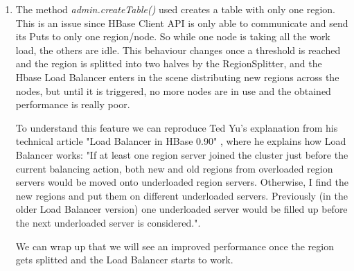 \begin{enumerate}
\item The method \textit{admin.createTable()} used creates a table with only one region. This is an issue since HBase Client API is only able to communicate and send its Puts to only one region/node. So while one node is taking all the work load, the others are idle. This behaviour changes once a threshold is reached and the region is splitted into two halves by the RegionSplitter, and the Hbase Load Balancer enters in the scene distributing new regions across the nodes, but until it is triggered, no more nodes are in use and the obtained performance is really poor.
\par

To understand this feature we can reproduce Ted Yu's explanation from his technical article "Load Balancer in HBase 0.90" \cite{LoadBalancer}, where he explains how Load Balancer works: "If at least one region server joined the cluster just before the current balancing action, both new and old regions from overloaded region servers would be moved onto underloaded region servers. Otherwise, I find the new regions and put them on different underloaded servers. Previously (in the older Load Balancer version) one underloaded server would be filled up before the next underloaded server is considered.".
\par
We can wrap up that we will see an improved performance once the region gets splitted and the Load Balancer starts to work.

\bigskip
{}
\bigskip


\end{enumerate}
